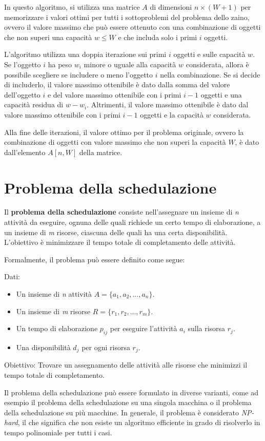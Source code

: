 In questo algoritmo, si utilizza una matrice $A$ di dimensioni $n \times (W+1)$ per memorizzare i valori ottimi per tutti i sottoproblemi del problema dello zaino, ovvero il valore massimo che può essere ottenuto con una combinazione di oggetti che non superi una capacità $w \leq W$ e che includa solo i primi $i$ oggetti.

L'algoritmo utilizza una doppia iterazione sui primi $i$ oggetti e sulle capacità $w$. Se l'oggetto $i$ ha peso $w_i$ minore o uguale alla capacità $w$ considerata, allora è possibile scegliere se includere o meno l'oggetto $i$ nella combinazione. Se si decide di includerlo, il valore massimo ottenibile è dato dalla somma del valore dell'oggetto $i$ e del valore massimo ottenibile con i primi $i-1$ oggetti e una capacità residua di $w-w_i$. Altrimenti, il valore massimo ottenibile è dato dal valore massimo ottenibile con i primi $i-1$ oggetti e la capacità $w$ considerata.

Alla fine delle iterazioni, il valore ottimo per il problema originale, ovvero la combinazione di oggetti con valore massimo che non superi la capacità $W$, è dato dall'elemento $A[n, W]$ della matrice.

\section{Problema della schedulazione}

Il \textbf{problema della schedulazione} consiste nell'assegnare un insieme di \textit{n} attività da eseguire, ognuna delle quali richiede un certo tempo di elaborazione, a un insieme di \textit{m} risorse, ciascuna delle quali ha una certa disponibilità. L'obiettivo è minimizzare il tempo totale di completamento delle attività.

Formalmente, il problema può essere definito come segue:

Dati:
\begin{itemize}
    \item Un insieme di \textit{n} attività $A = \{a_1, a_2, ..., a_n\}$.
    \item Un insieme di \textit{m} risorse $R = \{r_1, r_2, ..., r_m\}$.
    \item Un tempo di elaborazione $p_{ij}$ per eseguire l'attività $a_i$ sulla risorsa $r_j$.
    \item Una disponibilità $d_j$ per ogni risorsa $r_j$.
\end{itemize}
Obiettivo: Trovare un assegnamento delle attività alle risorse che minimizzi il tempo totale di completamento.

Il problema della schedulazione può essere formulato in diverse varianti, come ad esempio il problema della schedulazione su una singola macchina o il problema della schedulazione su più macchine. In generale, il problema è considerato \textit{NP-hard}, il che significa che non esiste un algoritmo efficiente in grado di risolverlo in tempo polinomiale per tutti i casi.
